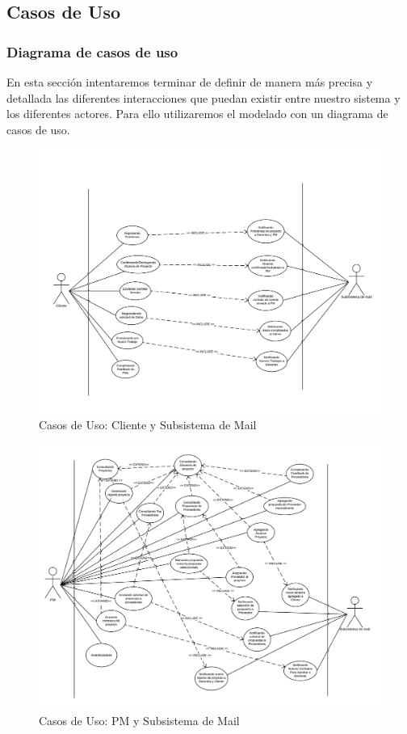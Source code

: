 \subsection{Casos de Uso}
\subsubsection{Diagrama de casos de uso}
En esta sección intentaremos terminar de definir de manera más precisa y detallada las diferentes interacciones que puedan existir entre nuestro sistema y los diferentes actores. Para ello utilizaremos el modelado con un diagrama de casos de uso.


\begin{figure}[H]
    \centering
    \includegraphics[width=\linewidth]{diag/viejos/cu1.pdf}
    \caption{Casos de Uso: Cliente y Subsistema de Mail}
    \label{cu1}
\end{figure}

\begin{figure}[H]
    \centering
    \includegraphics[width=\linewidth]{diag/viejos/cu2.pdf}
    \caption{Casos de Uso: PM y Subsistema de Mail}
    \label{cu2}
\end{figure}


